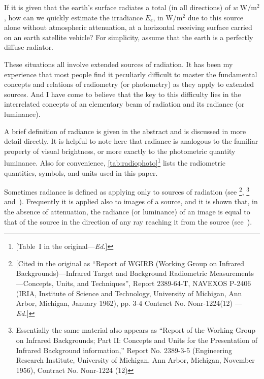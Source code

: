 \begin{refsection}
If it is given that the earth's surface radiates a total (in all directions) of
$w\;\unit{\watt\per\square\meter}$, how can we quickly estimate the irradiance
$E_e$,
in $\unit{\watt\per\square\meter}$ due to this source alone without atmospheric
attenuation, at a horizontal receiving surface carried on an earth satellite
vehicle?
For simplicity, assume that the earth is a perfectly diffuse radiator.

These situations all involve extended sources of radiation. It has been my experience
that most people find it peculiarly difficult to master the fundamental concepts and
relations of radiometry (or photometry) as they apply to extended sources. And I
have
come to believe that the key to this difficulty lies in the interrelated concepts of an
elementary beam of radiation and its radiance (or luminance).

A brief definition of radiance is given in the abstract and is discussed in more
detail
directly. It is helpful to note here that radiance is analogous to the familiar property
of visual brightness, or more exactly to the photometric quantity luminance.
Also for convenience, \cref{tab:radiophoto}\footnote{[Table~I in the
original---\textit{Ed.}]}
lists the radiometric quantities, symbols, and units used in this paper.

Sometimes radiance is defined as applying only to sources of radiation
(see \cite{kelton1963infrared}\footnote{[Cited in the original as ``Report of
WGIRB (Working Group on Infrared Backgrounds)---Infrared Target and Background
Radiometric Measurements---Concepts, Units, and Techniques'', Report 2389-64-T,
NAVEXOS P-2406 (IRIA, Institute of Science and Technology, University of
Michigan, Ann Arbor, Michigan, January 1962), pp. 3-4 Contract No. Nonr-1224(12)
---\textit{Ed.}]}, \cite{bell59}\footnote{Essentially the same
material also appears as “Report of the Working Group on Infrared Backgrounds;
Part II: Concepts and Units for the Presentation of Infrared Background
information,” Report No. 2389-3-5 (Engineering Research Institute, University of
Michigan, Ann Arbor, Michigan, November 1956), Contract No. Nonr-1224 (12)}
and~\cite{jenkins50}). Frequently it is applied also to images of a source,
and it is shown that, in the absence of attenuation, the radiance (or luminance)
of an image is equal to that of the source in the direction of any ray reaching
it from the source (see~\cite{jenkins50}).


\end{refsection}

